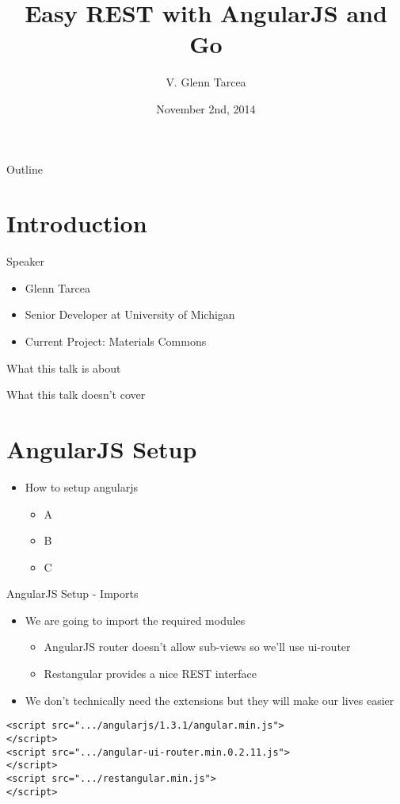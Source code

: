 \documentclass[presentation]{beamer}
\author{V. Glenn Tarcea}
\date{November 2nd, 2014}
\title{Easy REST with AngularJS and Go}
\begin{document}
\maketitle
\begin{frame}{Outline}
\tableofcontents
\end{frame}


\section{Introduction}
\label{sec-1}

\begin{frame}[label=sec-1-1]{Speaker}
\begin{itemize}
\item Glenn Tarcea
\item Senior Developer at University of Michigan
\item Current Project: Materials Commons
\end{itemize}
\end{frame}

\begin{frame}[label=sec-1-2]{What this talk is about}
\end{frame}

\begin{frame}[label=sec-1-3]{What this talk doesn't cover}
\end{frame}

\section{AngularJS Setup}
\label{sec-2}
\begin{itemize}
\item How to setup angularjs
\begin{itemize}
\item A
\item B
\item C
\end{itemize}
\end{itemize}

\begin{frame}[fragile,label=sec-2-1]{AngularJS Setup - Imports}
 \begin{itemize}
\item We are going to import the required modules
\begin{itemize}
\item AngularJS router doesn't allow sub-views so we'll use ui-router
\item Restangular provides a nice REST interface
\end{itemize}
\item We don't technically need the extensions but they will make our lives easier
\end{itemize}
\begin{verbatim}
<script src=".../angularjs/1.3.1/angular.min.js">
</script>
<script src=".../angular-ui-router.min.0.2.11.js">
</script>
<script src=".../restangular.min.js">
</script>
\end{verbatim}
\end{frame}
\end{document}
